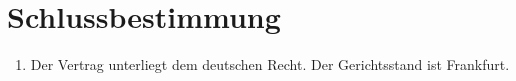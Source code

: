 \documentclass[a4paper, 12pt]{scrartcl}
\begin{document}
    \section{Schlussbestimmung}
    \begin{enumerate}
	\item Der Vertrag unterliegt dem deutschen Recht. Der Gerichtsstand ist Frankfurt.
    \end{enumerate}

    \newpage
    

    \newpage
    
\end{document}
